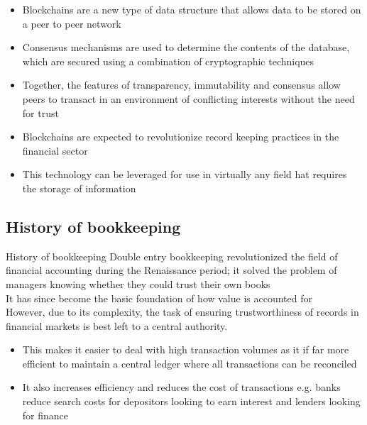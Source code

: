 \documentclass[9pt]{beamer}
\begin{document}
\begin{frame}{}
	\begin{itemize}
		\item Blockchains are a new type of data structure that allows data to be stored on a peer to peer network
		\item Consensus mechanisms are used to determine the contents of the database, which are secured using a combination of cryptographic techniques
		\item Together, the features of transparency, immutability and consensus allow peers to transact in an environment of conflicting interests without the need for trust
		\item Blockchains are expected to revolutionize record keeping practices in the financial sector
		\item This technology can be leveraged for use in virtually any field hat requires the storage of information
	\end{itemize}
\end{frame}

\subsection{History of bookkeeping}

\begin{frame}{History of bookkeeping}
	Double entry bookkeeping revolutionized the field of financial accounting during the Renaissance period; it solved the problem of managers knowing whether they could trust their own books \\ \vspace{3mm}
	It has since become the basic foundation of how value is accounted for\\ \vspace{3mm}
	However, due to its complexity, the task of ensuring trustworthiness of records in financial markets is best left to a central authority.
	\begin{itemize}
		\item This makes it easier to deal with high transaction volumes as it if far more efficient to maintain a central ledger where all transactions can be reconciled
		\item It also increases efficiency and reduces the cost of transactions e.g. banks reduce search costs for depositors looking to earn interest and lenders looking for finance
	\end{itemize}
\end{frame}
\end{document}
